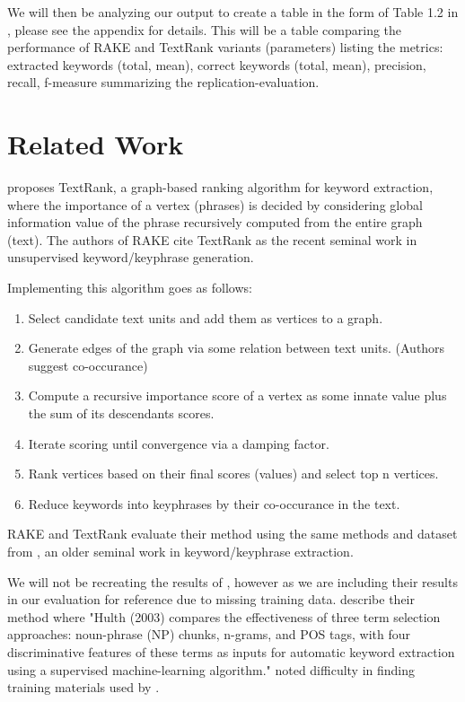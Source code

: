\documentclass[11pt,a4paper]{article}
\begin{document}
We will then be analyzing our output to create a table in the form of Table 1.2 in \citet{1}, please see the appendix for details. This will be a table comparing the performance of RAKE and TextRank variants (parameters) listing the metrics: extracted keywords (total, mean), correct keywords (total, mean), precision, recall, f-measure summarizing the replication-evaluation. 

\section{Related Work}

\citet{4} proposes TextRank, a graph-based ranking algorithm for keyword extraction, where the importance of a vertex (phrases) is decided by considering global information value of the phrase recursively computed from the entire graph (text). The authors of RAKE cite TextRank as the recent seminal work in unsupervised keyword/keyphrase generation. 

Implementing this algorithm goes as follows:

\begin{enumerate}
\item Select candidate text units and add them as vertices to a graph.
\item Generate edges of the graph via some relation between text units. (Authors suggest co-occurance)
\item Compute a recursive importance score of a vertex as some innate value plus the sum of its descendants scores.    
\item Iterate scoring until convergence via a damping factor. 
\item Rank vertices based on their final scores (values) and select top n vertices.
\item Reduce keywords into keyphrases by their co-occurance in the text.
\end{enumerate}   

RAKE and TextRank evaluate their method using the same methods and dataset from \citet{hulth-2003-improved}, an older seminal work in keyword/keyphrase extraction.

We will not be recreating the results of \citet{hulth-2003-improved}, however as we are including their results in our evaluation for reference due to missing training data. \citet{1} describe their method where "Hulth (2003) compares the effectiveness of three term selection approaches: noun-phrase (NP) chunks, n-grams, and POS tags, with four discriminative features of these terms as inputs for automatic keyword extraction using a supervised machine-learning algorithm." \citet{1} noted difficulty in finding training materials used by \citet{hulth-2003-improved}.    
\end{document}
